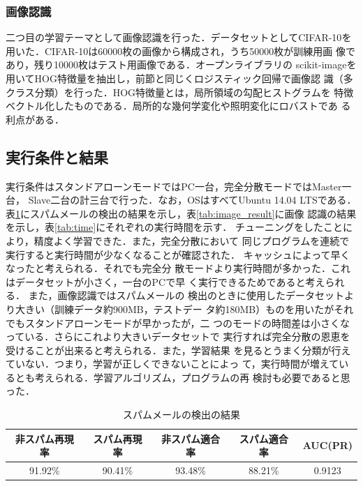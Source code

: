 \documentclass[a4paper,12pt]{jarticle}
\begin{document}
\subsubsection{画像認識}
二つ目の学習テーマとして画像認識を行った．データセットとしてCIFAR-10\cite{CIFAR}を
用いた．CIFAR-10は60000枚の画像から構成され，うち50000枚が訓練用画
像であり，残り10000枚はテスト用画像である．オープンライブラリの
scikit-imageを用いてHOG特徴量を抽出し，前節と同じくロジスティック回帰で画像認
識（多クラス分類）を行った．HOG特徴量とは，局所領域の勾配ヒストグラムを
特徴ベクトル化したものである．局所的な幾何学変化や照明変化にロバストであ
る利点がある．

\subsection{実行条件と結果}
実行条件はスタンドアローンモードではPC一台，完全分散モードではMaster一台，
Slave二台の計三台で行った．なお，OSはすべてUbuntu 14.04 LTSである．
表\ref{tab:mail_result}にスパムメールの検出の結果を示し，表\ref{tab:image_result}に画像
認識の結果を示し，表\ref{tab:time}にそれぞれの実行時間を示す．
チューニングをしたことにより，精度よく学習できた．また，完全分散において
同じプログラムを連続で実行すると実行時間が少なくなることが確認された．
キャッシュによって早くなったと考えられる．それでも完全分
散モードより実行時間が多かった．これはデータセットが小さく，一台のPCで早
く実行できるためであると考えられる．
また，画像認識ではスパムメールの
検出のときに使用したデータセットより大きい（訓練データ約900MB，テストデー
タ約180MB）ものを用いたがそれでもスタンドアローンモードが早かったが，二
つのモードの時間差は小さくなっている．さらにこれより大きいデータセットで
実行すれば完全分散の恩恵を受けることが出来ると考えられる．また，学習結果
を見るとうまく分類が行えていない．つまり，学習が正しくできないことによっ
て，実行時間が増えているとも考えられる．学習アルゴリズム，プログラムの再
検討も必要であると思った．
%
\newpage
\begin{table}[h]
\centering
\caption{スパムメールの検出の結果}
\label{tab:mail_result}
\fontsize{9pt}{10pt}\selectfont
\begin{tabular}{c|c|c|c|c} \hline
非スパム再現率&スパム再現率&非スパム適合率&スパム適合率&AUC(PR) \\\hline \hline 
91.92\% & 90.41\% & 93.48\% & 88.21\% & 0.9123 \\ \hline
\end{tabular}
\end{table}
\end{document}
